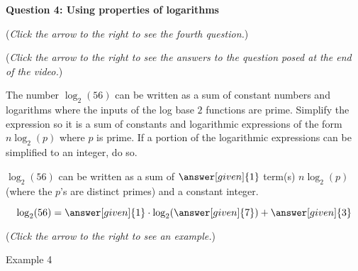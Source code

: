 \documentclass{ximera}
\begin{document}
\textbf{Question 4: Using properties of logarithms}
\begin{question}
\begin{flushright}
{\color{blue}(\emph{Click the arrow to the right to see the fourth question.})}
\end{flushright}
\begin{center}
\begin{expandable}
{\color{blue}(\emph{Click the arrow to the right to see the answers 
to the question posed at the end of the video.})}
\begin{expandable}
The number $\log_2(56)$ can be written as a sum of constant numbers
and  logarithms where the inputs of the log base $2$ functions are prime.
Simplify the expression so it is a sum of constants and logarithmic
expressions of the form $n\log_2(p)$ where $p$ is prime. If a portion
of the logarithmic expressions can be simplified to an integer, do so.\\
\begin{center}
$\log_2(56)$ can be written as a sum of $\answer[given]{1}$ term(s)
$n\log_2(p)$ (where the $p$'s are distinct primes) and a constant integer.
\end{center}
\begin{feedback}
\[
\log_2(56) = \answer[given]{1}\cdot \log_2 (\answer[given]{7}) + \answer[given]{3}
\]
\end{feedback}
\begin{flushright}
{\color{blue}(\emph{Click the arrow to the right to see an example.})}
\end{flushright}
\begin{expandable}
Example 4
\end{expandable}
\end{expandable}
\end{expandable}
\end{center}
\end{question}
\end{document}
